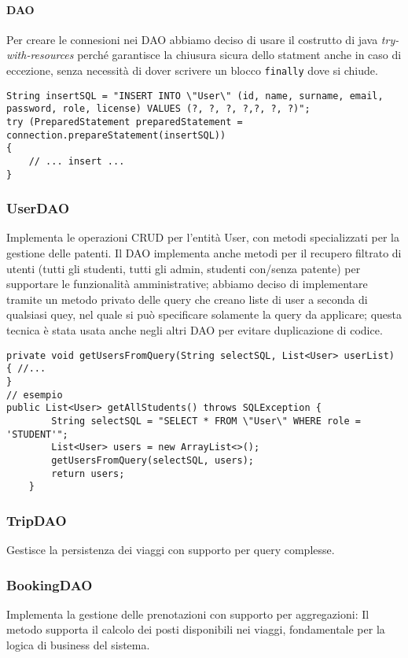 \paragraph{DAO} Per creare le connesioni nei DAO abbiamo deciso di usare il costrutto di java \textit{try-with-resources} perché garantisce la chiusura sicura dello statment anche in caso di eccezione, senza necessità di dover scrivere un blocco \texttt{finally} dove si chiude.
\begin{lstlisting}[style=java, caption={Esempio di uso di try-with-resources per la connessione nel metodo insertUser di UserDAO}]
String insertSQL = "INSERT INTO \"User\" (id, name, surname, email, password, role, license) VALUES (?, ?, ?, ?,?, ?, ?)";
try (PreparedStatement preparedStatement = connection.prepareStatement(insertSQL))
{
    // ... insert ...
}
\end{lstlisting}
\subsubsection{UserDAO}
Implementa le operazioni CRUD per l'entità User, con metodi specializzati per la gestione delle patenti. Il DAO implementa anche metodi per il recupero filtrato di utenti (tutti gli studenti, tutti gli admin, studenti con/senza patente) per supportare le funzionalità amministrative; abbiamo deciso di implementare tramite un metodo privato delle query che creano liste di user a seconda di qualsiasi quey, nel quale si può specificare solamente la query da applicare; questa tecnica è stata usata anche negli altri DAO per evitare duplicazione di codice.
\begin{lstlisting}[style=java, caption={Metodo per ottenere tutti gli User che soddisfano alcuni criteri}]
private void getUsersFromQuery(String selectSQL, List<User> userList) { //...
}
// esempio
public List<User> getAllStudents() throws SQLException {
        String selectSQL = "SELECT * FROM \"User\" WHERE role = 'STUDENT'";
        List<User> users = new ArrayList<>();
        getUsersFromQuery(selectSQL, users);
        return users;
    }
\end{lstlisting}
\subsubsection{TripDAO}
Gestisce la persistenza dei viaggi con supporto per query complesse.
\subsubsection{BookingDAO}
Implementa la gestione delle prenotazioni con supporto per aggregazioni:
Il metodo supporta il calcolo dei posti disponibili nei viaggi, fondamentale per la logica di business del sistema.
